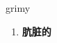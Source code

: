 
\begin{frame}
{\huge grimy}
\begin{center}
\begin{enumerate}\Large
  \item \textbf{肮脏的}
\end{enumerate}
\end{center}
\end{frame}
